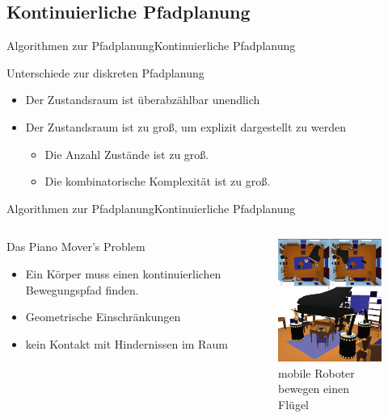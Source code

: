\documentclass[t,aspectratio=169,dvipsnames]{beamer}
\begin{document}
\subsection{Kontinuierliche Pfadplanung}
\begin{frame}{Algorithmen zur Pfadplanung}{Kontinuierliche Pfadplanung}
			\begin{block}{Unterschiede zur diskreten Pfadplanung}
			\begin{itemize}
				\item Der Zustandsraum ist überabzählbar unendlich
				\item Der Zustandsraum ist zu groß, um explizit dargestellt zu werden
				\begin{itemize} 
					\item Die Anzahl Zustände ist zu groß.
					\item Die kombinatorische Komplexität ist zu groß.
				\end{itemize}
			\end{itemize}
			\end{block}
\end{frame}

\begin{frame}{Algorithmen zur Pfadplanung}{Kontinuierliche Pfadplanung}
\begin{columns}
	\begin{column}[T]{0.5\textwidth}
		\begin{block}{Das Piano Mover's Problem}
		\begin{itemize}
			\item Ein Körper muss einen kontinuierlichen Bewegungspfad finden.
			\item Geometrische Einschränkungen
			\item kein Kontakt mit Hindernissen im Raum
		\end{itemize}
		\end{block}
	\end{column}
	\begin{column}[T]{0.5\textwidth}
		\begin{figure}
			\includegraphics[width=4.0cm]{images/img233.png}
			\caption{mobile Roboter bewegen einen Flügel \cite[Abb. 1.5, S.9]{Lav06}} 
		\end{figure}
	\end{column}
\end{columns}
\end{frame}
\end{document}
